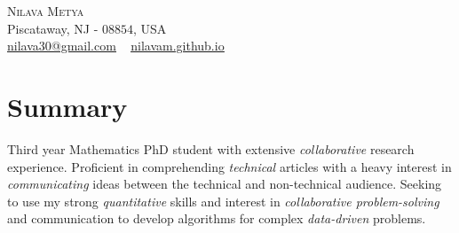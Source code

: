
\usepackage{tabto}
\usepackage{setspace}
\usepackage{etaremune}
\usepackage{xcolor}
\newcommand*\circled[1]{\tikz[baseline=(char.base)]{
            \node[shape=circle,draw,inner sep=1pt, line width=1.1pt] (char) {#1};}}






\begin{center}\vspace{-55pt}
    {\huge \scshape Nilava Metya} \\
    Piscataway, NJ - $08854$, USA\\
{\small 
\href{mailto:nilava30@gmail.com}{\circled{\scriptsize\faEnvelope}  \underline{nilava30@gmail.com}} ~ 
{\circled{\scriptsize\faHome} \underline{\url{nilavam.github.io}}}}
\end{center}

\section{Summary}

Third year Mathematics PhD student with extensive \textit{collaborative} research experience. Proficient in comprehending \textit{technical} articles with a heavy interest in \textit{communicating} ideas between the technical and non-technical audience. Seeking to use my strong \textit{quantitative} skills and interest in \textit{collaborative problem-solving} and communication to develop algorithms for complex \textit{data-driven} problems.

